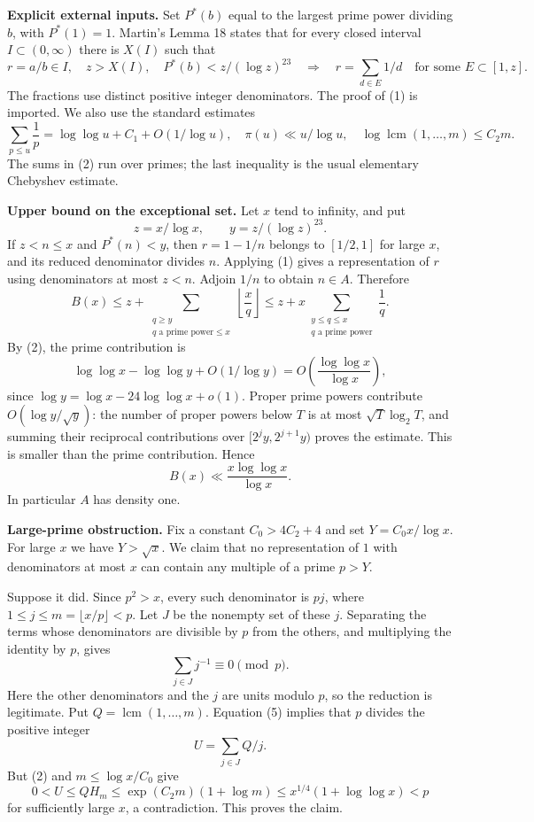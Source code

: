 \textbf{Explicit external inputs.} Set $P^*(b)$ equal to the largest prime power dividing $b$, with $P^*(1)=1$. Martin's Lemma 18 states that for every closed interval $I\subset(0,\infty)$ there is $X(I)$ such that
\[
r=a/b\in I,\quad z>X(I),\quad P^*(b)<z/(\log z)^{23}
\quad\Longrightarrow\quad
r=\sum_{d\in E}1/d\quad\text{for some }E\subset[1,z].
\tag{1}
\]
The fractions use distinct positive integer denominators. The proof of (1) is imported. We also use the standard estimates
\[
\sum_{p\leq u}\frac1p=\log\log u+C_1+O(1/\log u),\quad
\pi(u)\ll u/\log u,\quad
\log\operatorname{lcm}(1,\ldots,m)\leq C_2m.
\tag{2}
\]
The sums in (2) run over primes; the last inequality is the usual elementary Chebyshev estimate.

\textbf{Upper bound on the exceptional set.} Let $x$ tend to infinity, and put
\[
z=x/\log x,\qquad y=z/(\log z)^{23}.
\]
If $z<n\leq x$ and $P^*(n)<y$, then $r=1-1/n$ belongs to $[1/2,1]$ for large $x$, and its reduced denominator divides $n$. Applying (1) gives a representation of $r$ using denominators at most $z<n$. Adjoin $1/n$ to obtain $n\in A$. Therefore
\[
B(x)\leq z+\sum_{\substack{q\geq y\\q\text{ a prime power}\leq x}}\left\lfloor\frac xq\right\rfloor
\leq z+x\sum_{\substack{y\leq q\leq x\\q\text{ a prime power}}}\frac1q.
\tag{3}
\]
By (2), the prime contribution is
\[
\log\log x-\log\log y+O(1/\log y)
=O\!\left(\frac{\log\log x}{\log x}\right),
\]
since $\log y=\log x-24\log\log x+o(1)$. Proper prime powers contribute $O(\log y/\sqrt y)$: the number of proper powers below $T$ is at most $\sqrt T\log_2T$, and summing their reciprocal contributions over $[2^jy,2^{j+1}y)$ proves the estimate. This is smaller than the prime contribution. Hence
\[
B(x)\ll\frac{x\log\log x}{\log x}.
\tag{4}
\]
In particular $A$ has density one.

\textbf{Large-prime obstruction.} Fix a constant $C_0>4C_2+4$ and set $Y=C_0x/\log x$. For large $x$ we have $Y>\sqrt x$. We claim that no representation of $1$ with denominators at most $x$ can contain any multiple of a prime $p>Y$.

Suppose it did. Since $p^2>x$, every such denominator is $pj$, where $1\leq j\leq m=\lfloor x/p\rfloor<p$. Let $J$ be the nonempty set of these $j$. Separating the terms whose denominators are divisible by $p$ from the others, and multiplying the identity by $p$, gives
\[
\sum_{j\in J}j^{-1}\equiv0\pmod p.
\tag{5}
\]
Here the other denominators and the $j$ are units modulo $p$, so the reduction is legitimate. Put $Q=\operatorname{lcm}(1,\ldots,m)$. Equation (5) implies that $p$ divides the positive integer
\[
U=\sum_{j\in J}Q/j.
\]
But (2) and $m\leq\log x/C_0$ give
\[
0<U\leq QH_m\leq\exp(C_2m)(1+\log m)
\leq x^{1/4}(1+\log\log x)<p
\]
for sufficiently large $x$, a contradiction. This proves the claim.

